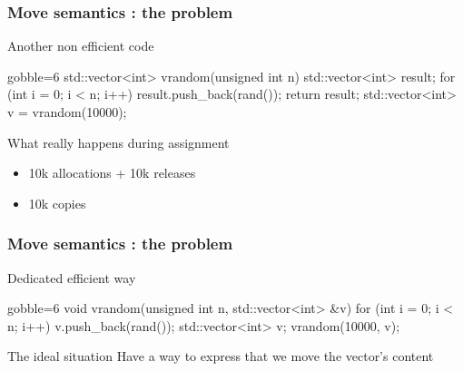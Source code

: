 \begin{frame}[fragile]
  \frametitle{Move semantics : the problem}
  \begin{exampleblock}{Another non efficient code}
    \begin{cppcode*}{gobble=6}
      std::vector<int> vrandom(unsigned int n) {
        std::vector<int> result;
        for (int i = 0; i < n; i++) {
          result.push_back(rand());
        }
        return result;
      }
      std::vector<int> v = vrandom(10000);
    \end{cppcode*}
  \end{exampleblock}
  \pause
  \begin{alertblock}{What really happens during assignment}
    \begin{itemize}
    \item 10k allocations + 10k releases
    \item 10k copies
    \end{itemize}
  \end{alertblock}
\end{frame}

\begin{frame}[fragile]
  \frametitle{Move semantics : the problem}
  \begin{exampleblock}{Dedicated efficient way}
    \begin{cppcode*}{gobble=6}
      void vrandom(unsigned int n, std::vector<int> &v) {
        for (int i = 0; i < n; i++) {
          v.push_back(rand());
        }
      }
      std::vector<int> v;
      vrandom(10000, v);
    \end{cppcode*}
  \end{exampleblock}
  \pause
  \begin{block}{The ideal situation}
    Have a way to express that we move the vector's content
  \end{block}
\end{frame}

